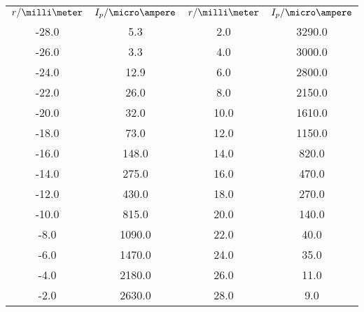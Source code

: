 \begin{table}
\begin{tabular}{cccc}
$r/ \milli\meter$ & $I_p / \micro\ampere$ & $r/ \milli\meter$ & $I_p / \micro\ampere$ \\
-28.0 & 5.3 & 2.0 & 3290.0 \\
-26.0 & 3.3 & 4.0 & 3000.0 \\
-24.0 & 12.9 & 6.0 & 2800.0 \\
-22.0 & 26.0 & 8.0 & 2150.0 \\
-20.0 & 32.0 & 10.0 & 1610.0 \\
-18.0 & 73.0 & 12.0 & 1150.0 \\
-16.0 & 148.0 & 14.0 & 820.0 \\
-14.0 & 275.0 & 16.0 & 470.0 \\
-12.0 & 430.0 & 18.0 & 270.0 \\
-10.0 & 815.0 & 20.0 & 140.0 \\
-8.0 & 1090.0 & 22.0 & 40.0 \\
-6.0 & 1470.0 & 24.0 & 35.0 \\
-4.0 & 2180.0 & 26.0 & 11.0 \\
-2.0 & 2630.0 & 28.0 & 9.0 \\
\end{tabular}
\end{table}
